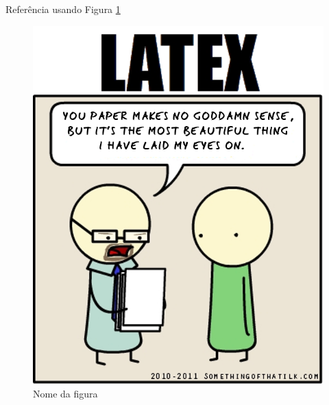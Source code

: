 Referência usando Figura \ref{fig:exemplo}

\begin{figure}[htbp!]
	\centering
	\includegraphics[scale=0.1]{figuras/135.png}
	\caption{Nome da figura}
	\label{fig:exemplo}
\end{figure}

